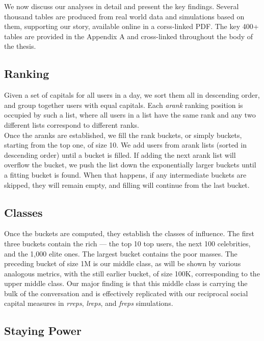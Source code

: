 \documentclass[10pt,oneside]{memoir}
\begin{document}
We now discuss our analyses in detail and present the key findings.  Several thousand tables are produced from real world data and simulations based on them, supporting our story, available online in a corss-linked PDF.  The key 400+ tables are provided in the Appendix A and cross-linked throughout the body of the thesis.


\subsection{Ranking}
\label{ranking}

Given a set of capitals for all users in a day, we sort them all in descending order, and group together users with equal capitals.  Each \emph{arank} ranking position is occupied by such a list, where all users in a list have the same rank and any two different lists correspond to different ranks. \\
Once the aranks are established, we fill the rank buckets, or simply buckets, starting from the top one, of size 10.  We add users from arank lists (sorted in descending order) until a bucket is filled.  If adding the next arank list will overflow the bucket, we push the list down the exponentially larger buckets until a fitting bucket is found.  When that happens, if any intermediate buckets are skipped, they will remain empty, and filling will continue from the last bucket.


\subsection{Classes}
\label{classes}

Once the buckets are computed, they establish the classes of influence.  The first three buckets contain the rich --- the top 10 top users, the next 100 celebrities, and the 1,000 elite ones.  The largest bucket contains the poor masses.  The preceding bucket of size 1M is our middle class, as will be shown by various analogous metrics, with the still earlier bucket, of size 100K, corresponding to the upper middle class. Our major finding is that this middle class is carrying the bulk of the conversation and is effectively replicated with our reciprocal social capital measures in \emph{rreps}, \emph{lreps}, and \emph{freps} simulations.


\subsection{Staying Power}
\label{stayingpower}
\end{document}
